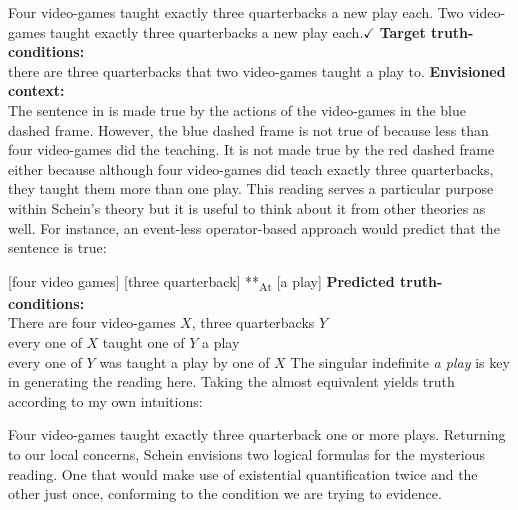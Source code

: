 \pex
\a 
Four video-games taught exactly three quarterbacks a new play each.\hfill *\cnextx[d]
\a 
Two video-games taught exactly three quarterbacks a new play each.\hfill $\checkmark$\cnextx[d]
\a 
\textbf{Target truth-conditions:}\\
there are three quarterbacks that two video-games taught a play to.
\a 
\renewcommand{\scale}{0.6}
\textbf{Envisioned context:}\\

\xe
%
The sentence in \clastxb is made true by the actions of the video-games in the blue dashed frame. However, the blue dashed frame is not true of \clastxa because less than four video-games did the teaching. It is not made true by the red dashed frame either because although four video-games did teach exactly three quarterbacks, they taught them more than one play. This reading serves a particular purpose within Schein's theory but it is useful to think about it from other theories as well. For instance, an event-less operator-based approach would predict that the sentence is true:

\pex
\a{}
[four video games]  [three quarterback] **\textsubscript{At} [a play]
\a \textbf{Predicted truth-conditions:} \\
There are four video-games $X$, three quarterbacks $Y$\\
every one of $X$ taught one of $Y$ a play\\
every one of $Y$ was taught a play by one of $X$
\xe
%
The singular indefinite \emph{a play} is key in generating the reading here. Taking the almost equivalent  yields truth according to my own intuitions:

\ex
Four video-games taught exactly three quarterback one or more plays.
\xe
%
Returning to our local concerns, Schein envisions two logical formulas for the mysterious reading. One that would make use of existential quantification twice and the other just once, conforming to the condition we are trying to evidence.

